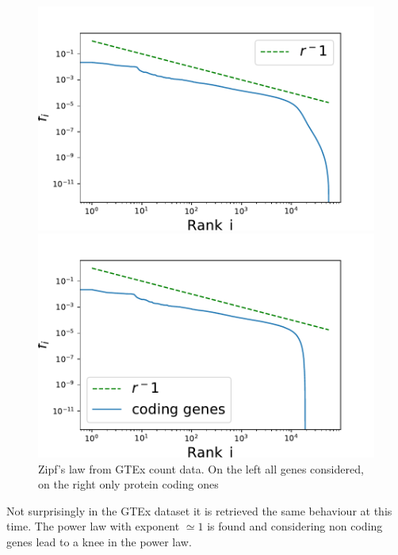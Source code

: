 \begin{figure}[htb!]
    \centering
    \begin{minipage}{0.45\textwidth}
    \includegraphics[width=0.95\linewidth]{pictures/structure/gtex/globalZipf.pdf}
    \end{minipage}
    \hspace{2mm}
    \begin{minipage}{0.45\textwidth}
    \includegraphics[width=0.95\linewidth]{pictures/structure/gtex/globalZipf_c.pdf}
    \end{minipage}
    \caption{Zipf's law from GTEx count data. On the left all genes considered, on the right only protein coding ones}
    \label{fig:my_label}
\end{figure}
Not surprisingly in the GTEx dataset it is retrieved the same behaviour at this time. The power law with exponent $\simeq 1$ is found and considering non coding genes lead to a knee in the power law.

